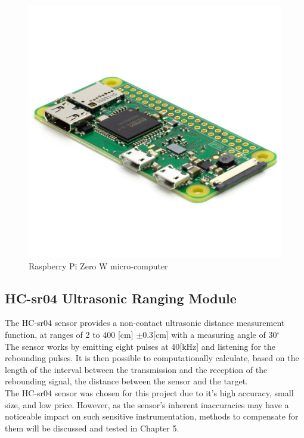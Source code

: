 \documentclass[twoside]{ctuthesis}
\theoremstyle{plain}
\theoremstyle{definition}
\theoremstyle{note}
\begin{document}
\begin{figure}[H]
	\centering
	\includegraphics[scale=0.15]{RasPIZeroW}
	\caption{Raspberry Pi Zero W micro-computer \cite{RasPi0W}}
\end{figure}


\subsection{HC-sr04 Ultrasonic Ranging Module}
The HC-sr04 sensor provides a non-contact ultrasonic distance measurement function, at ranges of 2 to 400 [cm] $\pm$0.3[cm] with a measuring angle of 30$^\circ$\\
The sensor works by emitting eight pulses at 40[kHz] and listening for the rebounding pulses. It is then possible to computationally calculate, based on the length of the interval between the transmission and the reception of the rebounding signal, the distance between the sensor and the target.\\
The HC-sr04 sensor was chosen for this project due to it's high accuracy, small size, and low price. However, as the sensor's inherent inaccuracies may have a noticeable impact on such sensitive instrumentation, methods to compensate for them will be discussed and tested in Chapter 5.\\
\end{document}
